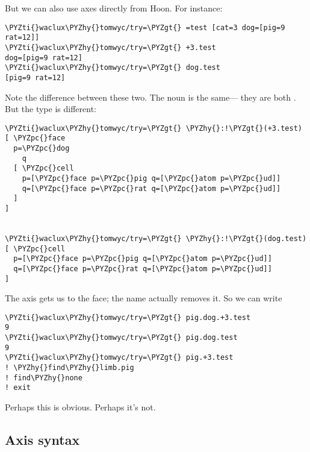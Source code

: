 But we can also use axes directly from Hoon.  For instance:

\begin{framed_shaded}
\begin{Verbatim}[fontsize=\relsize{-2.5},fontseries=b,commandchars=\\\{\}]
\PYZti{}waclux\PYZhy{}tomwyc/try=\PYZgt{} =test [cat=3 dog=[pig=9 rat=12]]
\PYZti{}waclux\PYZhy{}tomwyc/try=\PYZgt{} +3.test
dog=[pig=9 rat=12]
\PYZti{}waclux\PYZhy{}tomwyc/try=\PYZgt{} dog.test
[pig=9 rat=12]
\end{Verbatim}
\end{framed_shaded}

Note the difference between these two.  The noun is the same---
they are both \kode{[9 12]}.  But the type is different:

\begin{framed_shaded}
\begin{Verbatim}[fontsize=\relsize{-2.5},fontseries=b,commandchars=\\\{\}]
\PYZti{}waclux\PYZhy{}tomwyc/try=\PYZgt{} \PYZhy{}:!\PYZgt{}(+3.test)
[ \PYZpc{}face
  p=\PYZpc{}dog
    q
  [ \PYZpc{}cell
    p=[\PYZpc{}face p=\PYZpc{}pig q=[\PYZpc{}atom p=\PYZpc{}ud]]
    q=[\PYZpc{}face p=\PYZpc{}rat q=[\PYZpc{}atom p=\PYZpc{}ud]]
  ]
]


\PYZti{}waclux\PYZhy{}tomwyc/try=\PYZgt{} \PYZhy{}:!\PYZgt{}(dog.test)
[ \PYZpc{}cell
  p=[\PYZpc{}face p=\PYZpc{}pig q=[\PYZpc{}atom p=\PYZpc{}ud]]
  q=[\PYZpc{}face p=\PYZpc{}rat q=[\PYZpc{}atom p=\PYZpc{}ud]]
]
\end{Verbatim}
\end{framed_shaded}

The axis gets us to the  face; the name actually removes it.
So we can write

\begin{framed_shaded}
\begin{Verbatim}[fontsize=\relsize{-2.5},fontseries=b,commandchars=\\\{\}]
\PYZti{}waclux\PYZhy{}tomwyc/try=\PYZgt{} pig.dog.+3.test
9
\PYZti{}waclux\PYZhy{}tomwyc/try=\PYZgt{} pig.dog.test
9
\PYZti{}waclux\PYZhy{}tomwyc/try=\PYZgt{} pig.+3.test
! \PYZhy{}find\PYZhy{}limb.pig
! find\PYZhy{}none
! exit
\end{Verbatim}
\end{framed_shaded}

Perhaps this is obvious.  Perhaps it's not.

\subsection{Axis syntax}

